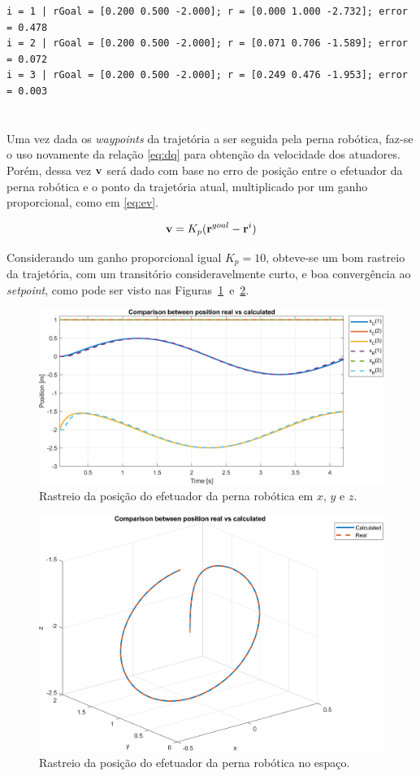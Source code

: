 \begin{verbatim}
i = 1 | rGoal = [0.200 0.500 -2.000]; r = [0.000 1.000 -2.732]; error = 0.478 
i = 2 | rGoal = [0.200 0.500 -2.000]; r = [0.071 0.706 -1.589]; error = 0.072 
i = 3 | rGoal = [0.200 0.500 -2.000]; r = [0.249 0.476 -1.953]; error = 0.003 
\end{verbatim}


\section{}

Uma vez dada os \textit{waypoints} da trajetória a ser seguida pela perna robótica, faz-se o uso novamente da relação \eqref{eq:dq} para obtenção da velocidade dos atuadores. Porém, dessa vez $\mathbf{v}$ será dado com base no erro de posição entre o efetuador da perna robótica e o ponto da trajetória atual, multiplicado por um ganho proporcional, como em \eqref{eq:ev}.

\begin{equation}\label{eq:ev}
	\mathbf{v} = K_p(\mathbf{r}^{goal} - \mathbf{r}^{i})
\end{equation}

Considerando um ganho proporcional igual $K_p = 10$, obteve-se um bom rastreio da trajetória, com um transitório consideravelmente curto, e boa convergência ao \textit{setpoint}, como pode ser visto nas Figuras~\ref{fig:Ex5_effector_position}~e~\ref{fig:Ex5_effector_position_3d}.

\begin{figure}[H]
	\centering
	\includegraphics[width=0.75\linewidth]{img/Ex5_effector_position}
	\caption{Rastreio da posição do efetuador da perna robótica em $x$, $y$ e $z$.}
	\label{fig:Ex5_effector_position}
\end{figure}

\begin{figure}[H]
\centering
\includegraphics[width=0.75\linewidth]{img/Ex5_effector_position_3d}
\caption{Rastreio da posição do efetuador da perna robótica no espaço.}
\label{fig:Ex5_effector_position_3d}
\end{figure}

